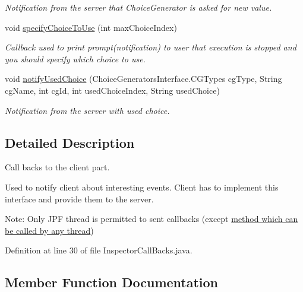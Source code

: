 \begin{DoxyCompactItemize}
\begin{DoxyCompactList}\small\item\em Notification from the server that Choice\+Generator is asked for new value. \end{DoxyCompactList}\item 
void \hyperlink{interfacegov_1_1nasa_1_1jpf_1_1inspector_1_1interfaces_1_1_inspector_call_backs_a95bd37f4f3ad147514c86fa77856b51d}{specify\+Choice\+To\+Use} (int max\+Choice\+Index)
\begin{DoxyCompactList}\small\item\em Callback used to print prompt(notification) to user that execution is stopped and you should specify which choice to use. \end{DoxyCompactList}\item 
void \hyperlink{interfacegov_1_1nasa_1_1jpf_1_1inspector_1_1interfaces_1_1_inspector_call_backs_a83f9486958bbd33ee9d1a767252dbfd6}{notify\+Used\+Choice} (Choice\+Generators\+Interface.\+C\+G\+Types cg\+Type, String cg\+Name, int cg\+Id, int used\+Choice\+Index, String used\+Choice)
\begin{DoxyCompactList}\small\item\em Notification from the server with used choice. \end{DoxyCompactList}\end{DoxyCompactItemize}


\subsection{Detailed Description}
Call backs to the client part. 

Used to notify client about interesting events. Client has to implement this interface and provide them to the server.

Note\+: Only J\+PF thread is permitted to sent callbacks (except \hyperlink{interfacegov_1_1nasa_1_1jpf_1_1inspector_1_1interfaces_1_1_inspector_call_backs_afe2463c7186265f972991c9c7ab4ec19}{method which can be called by any thread}) 

Definition at line 30 of file Inspector\+Call\+Backs.\+java.



\subsection{Member Function Documentation}

